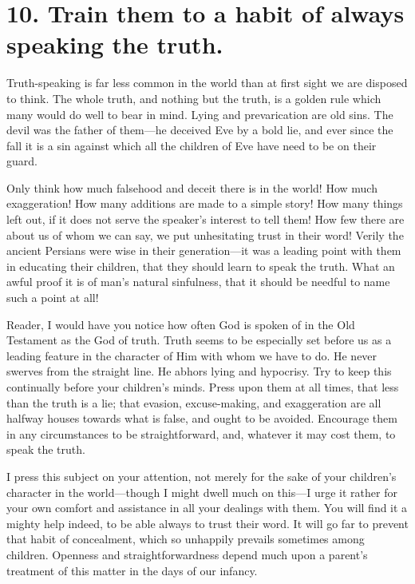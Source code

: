 \documentclass[
]{book}
\begin{document}
\hypertarget{train-them-to-a-habit-of-always-speaking-the-truth.}{%
\section*{10. Train them to a habit of always speaking the truth.}\label{train-them-to-a-habit-of-always-speaking-the-truth.}}

Truth-speaking is far less common in the world than at first sight we are disposed to think. The whole truth, and nothing but the truth, is a golden rule which many would do well to bear in mind. Lying and prevarication are old sins. The devil was the father of them---he deceived Eve by a bold lie, and ever since the fall it is a sin against which all the children of Eve have need to be on their guard.

Only think how much falsehood and deceit there is in the world! How much exaggeration! How many additions are made to a simple story! How many things left out, if it does not serve the speaker's interest to tell them! How few there are about us of whom we can say, we put unhesitating trust in their word! Verily the ancient Persians were wise in their generation---it was a leading point with them in educating their children, that they should learn to speak the truth. What an awful proof it is of man's natural sinfulness, that it should be needful to name such a point at all!

Reader, I would have you notice how often God is spoken of in the Old Testament as the God of truth. Truth seems to be especially set before us as a leading feature in the character of Him with whom we have to do. He never swerves from the straight line. He abhors lying and hypocrisy. Try to keep this continually before your children's minds. Press upon them at all times, that less than the truth is a lie; that evasion, excuse-making, and exaggeration are all halfway houses towards what is false, and ought to be avoided. Encourage them in any circumstances to be straightforward, and, whatever it may cost them, to speak the truth.

I press this subject on your attention, not merely for the sake of your children's character in the world---though I might dwell much on this---I urge it rather for your own comfort and assistance in all your dealings with them. You will find it a mighty help indeed, to be able always to trust their word. It will go far to prevent that habit of concealment, which so unhappily prevails sometimes among children. Openness and straightforwardness depend much upon a parent's treatment of this matter in the days of our infancy.
\end{document}

